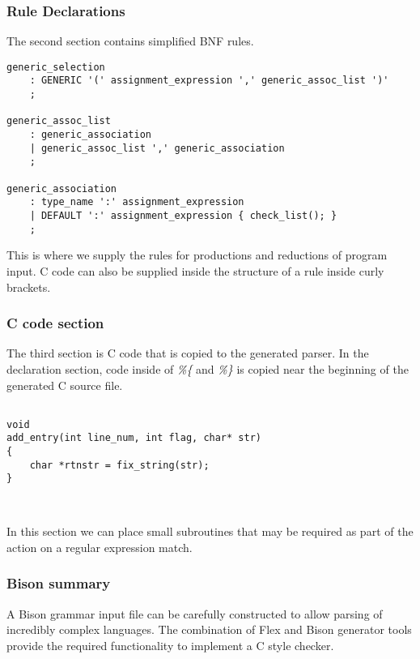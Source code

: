 \subsubsection{Rule Declarations} 
\noindent The second section contains simplified BNF rules.
\begingroup
    \fontsize{8pt}{8pt}\selectfont
\begin{verbatim}
generic_selection
    : GENERIC '(' assignment_expression ',' generic_assoc_list ')'
    ;

generic_assoc_list
    : generic_association
    | generic_assoc_list ',' generic_association
    ;

generic_association
    : type_name ':' assignment_expression
    | DEFAULT ':' assignment_expression { check_list(); }
    ;
\end{verbatim}
\endgroup
\noindent This is where we supply the rules for productions and reductions of 
program input. C code can also be supplied inside the structure of a rule 
inside curly brackets.

\subsubsection{C code section}
\noindent The third section is C code that is copied to the generated parser.
In the declaration section, code inside of \emph{\%\{} and \emph{\%\}} is 
copied near the beginning of the generated C source file. 
\begingroup
    \fontsize{8pt}{8pt}\selectfont
\begin{verbatim}

void
add_entry(int line_num, int flag, char* str)
{
    char *rtnstr = fix_string(str);
}



\end{verbatim}
\endgroup
\noindent In this section we can place small subroutines that may be required
as part of the action on a regular expression match.\\

\subsubsection{Bison summary}
A Bison grammar input file can be carefully constructed to allow parsing of 
incredibly complex languages. The combination of Flex and Bison generator tools
provide the required functionality to implement a C style checker. 


